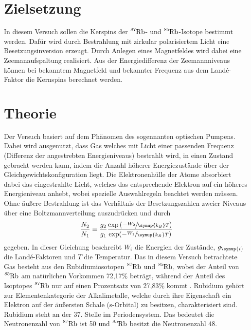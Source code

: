 \section{Zielsetzung}
\label{sec:Zielsetzung}
In diesem Versuch sollen die Kerspins der $\ce{^87Rb}$- und $\ce{^85Rb}$-Isotope
bestimmt werden. Dafür wird durch Bestrahlung mit zirkular polarisiertem Licht 
eine Besetzungsinversion erzeugt. Durch Anlegen eines Magnetfeldes wird dabei eine 
Zeemanaufspaltung realisiert. Aus der Energiedifferenz der Zeemannniveaus können bei 
bekanntem Magnetfeld und bekannter Frequenz aus dem Landé-Faktor die Kernspins
berechnet werden. 

\section{Theorie}
\label{sec:Theorie}

Der Versuch basiert auf dem Phänomen des sogennanten optischen Pumpens. 
Dabei wird ausgenutzt, dass Gas welches mit Licht einer passenden Frequenz 
(Differenz der angestrebten Energieniveaus) bestrahlt wird, in einen Zustand 
gebracht werden kann, indem die Anzahl höherer Energiezustände über der 
Gleichgewichtskonfiguration liegt. Die Elektronenhülle der Atome 
absorbiert dabei das eingestrahlte Licht, welches das entsprechende Elektron 
auf ein höheres Energieniveau anhebt, wobei spezielle Auswahlregeln beachtet 
werden müssen.
Ohne äußere Bestrahlung ist das Verhältnis der Besetzungszahlen zweier Niveaus 
über eine Boltzmannverteilung auszudrücken und durch
\begin{equation}
    \frac{N_2}{N_1}=\frac{g_2}{g_1}\frac{\exp\left(-\sfrac{W_2}{\symup{k_B}T}\right)}{\exp(-\sfrac{W_1}{\symup{k_B}T})}
\end{equation}
gegeben. In dieser Gleichung beschreibt $W_i$ die Energien der Zustände, 
$g_{\symup{i}}$ die Landé-Faktoren und $T$ die Temperatur.
Das in diesem Versuch betrachtete Gas besteht aus den Rubidiumiosotopen 
$\ce{^87Rb}$ und $\ce{^85Rb}$, wobei der Anteil von $\ce{^85Rb}$ am natürlichen 
Vorkommen 72,17\% beträgt, während der Anteil des Isoptopes $\ce{^87Rb}$
nur auf einen Prozentsatz  von 27,83\% kommt \cite{RbVorkommen}.
Rubidium gehört zur Elementenkategorie der Alkalimetalle, welche durch ihre 
Eigenschaft ein Elektron auf der äußersten Schale (s-Orbital) zu besitzen, 
charakterisiert sind.
Rubidium steht an der 37. Stelle im Periodensystem. Das bedeutet die 
Neutronenzahl von $\ce{^87Rb}$ ist 50 und $\ce{^85Rb}$ besitzt die Neutronenzahl 48.

